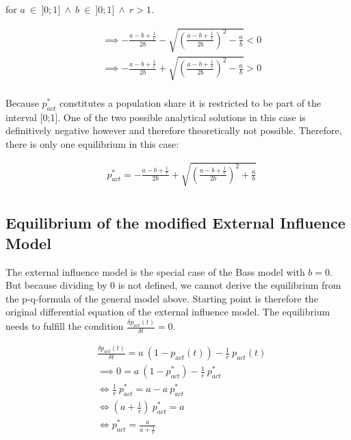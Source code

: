 \documentclass[a4paper,12pt]{article}
\begin{document}
for $a  \ \in \ ]0;1] \ \land \ b \ \in \ ]0;1] \ \land \ r > 1$.

\begin{align*}
&\implies  - \frac{a - b + \frac{1}{r}}{2b} - \sqrt{\left( \frac{a - b + \frac{1}{r}}{2b} \right)^2 - \frac{a}{b}} < 0 \\
&\implies  - \frac{a - b + \frac{1}{r}}{2b} + \sqrt{\left( \frac{a - b + \frac{1}{r}}{2b} \right)^2 - \frac{a}{b}} > 0 \\
\end{align*}

Because $p_{act}^{*}$ constitutes a population share it is restricted to be part of the interval [0;1]. One of the two possible analytical solutions in this case is definitively negative however and therefore theoretically not possible. Therefore, there is only one equilibrium in this case:
    
\begin{align*}
&p_{act}^{*} = - \frac{a - b + \frac{1}{r}}{2b} + \sqrt{\left( \frac{a - b + \frac{1}{r}}{2b} \right)^2 + \frac{a}{b}} \\
\end{align*}


\subsection*{Equilibrium of the modified External Influence Model}

The external influence model is the special case of the Bass model with $b = 0$. But because dividing by 0 is not defined, we cannot derive the equilibrium from the p-q-formula of the general model above. Starting point is therefore the original differential equation of the external influence model. The equilibrium needs to fulfill the condition $\frac{\delta p_{act}(t)}{\delta t} = 0$.

\begin{align*}
 & \frac{\delta p_{act}(t)}{\delta t} = a \ (1 - p_{act}(t)) - \frac{1}{r} \ p_{act}(t) \\
&\implies 0 = a \ (1 - p_{act}^{*}) - \frac{1}{r} \ p_{act}^{*} \\
&\iff \frac{1}{r} \ p_{act}^{*} = a - a  \ p_{act}^{*} \\
&\iff  (a + \frac{1}{r}) \ p_{act}^{*} = a \\
&\iff p_{act}^{*} = \frac{a}{a + \frac{1}{r}}
\end{align*}
\end{document}
